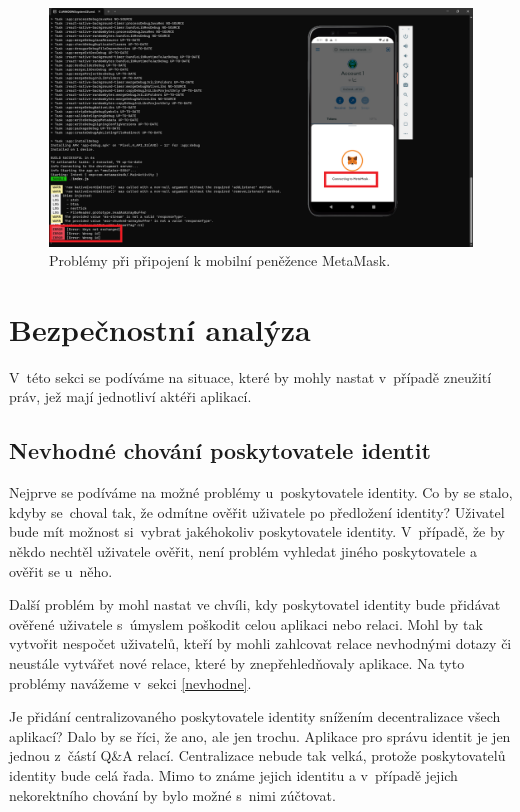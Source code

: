 \begin{figure}
\centering
\includegraphics[width=\linewidth]{obrazky/dukaz.png}
\caption{Problémy při připojení k mobilní peněžence MetaMask.}
\label{fig:chyby}
\end{figure}

\section{Bezpečnostní analýza}
V~této sekci se podíváme na situace, které by mohly nastat v~případě zneužití práv, jež mají jednotliví aktéři aplikací.  
\subsection{Nevhodné chování poskytovatele identit}
\label{poskytovatel}
Nejprve se podíváme na možné problémy u~poskytovatele identity. Co by se stalo, kdyby se~choval tak, že odmítne ověřit uživatele po předložení identity? Uživatel bude mít možnost si~vybrat jakéhokoliv poskytovatele identity. V~případě, že by někdo nechtěl uživatele ověřit, není problém vyhledat jiného poskytovatele a ověřit se u~něho. 

Další problém by mohl nastat ve chvíli, kdy poskytovatel identity bude přidávat ověřené uživatele s~úmyslem poškodit celou aplikaci nebo relaci. Mohl by tak vytvořit nespočet uživatelů, kteří by mohli zahlcovat relace nevhodnými dotazy či neustále vytvářet nové relace, které by znepřehledňovaly aplikace. Na tyto problémy navážeme v~sekci \ref{nevhodne}. 

Je přidání centralizovaného poskytovatele identity snížením decentralizace všech aplikací? Dalo by se říci, že ano, ale jen trochu. Aplikace pro správu identit je jen jednou z~částí Q\&A relací.  Centralizace nebude tak velká, protože poskytovatelů identity bude celá řada. Mimo to známe jejich identitu a v~případě jejich nekorektního chování by bylo možné s~nimi zúčtovat. 

